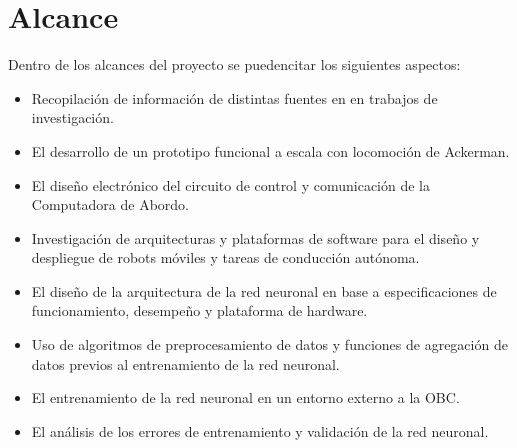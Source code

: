 \documentclass[12pt,letterpaper]{article}
\begin{document}
\section{Alcance}

Dentro de los alcances del proyecto se puedencitar los siguientes
aspectos:

\begin{itemize}
    \item Recopilación de información de distintas fuentes en 
    en trabajos de investigación.
    \item El desarrollo de un prototipo funcional a escala con 
    locomoción de Ackerman.
    \item El diseño electrónico del circuito de control y comunicación de
    la Computadora de Abordo.
    \item Investigación de arquitecturas y plataformas de software para el
    diseño y despliegue de robots móviles y tareas de conducción autónoma.
    \item El diseño de la arquitectura de la red neuronal en base a 
    especificaciones de funcionamiento, desempeño y plataforma de hardware.
    \item Uso de algoritmos de preprocesamiento de datos y funciones
    de agregación de datos previos al entrenamiento de la red neuronal.
    \item El entrenamiento de la red neuronal en un entorno externo a la OBC.
    \item El análisis de los errores de entrenamiento y validación de la red neuronal.

\end{itemize}
\end{document}
